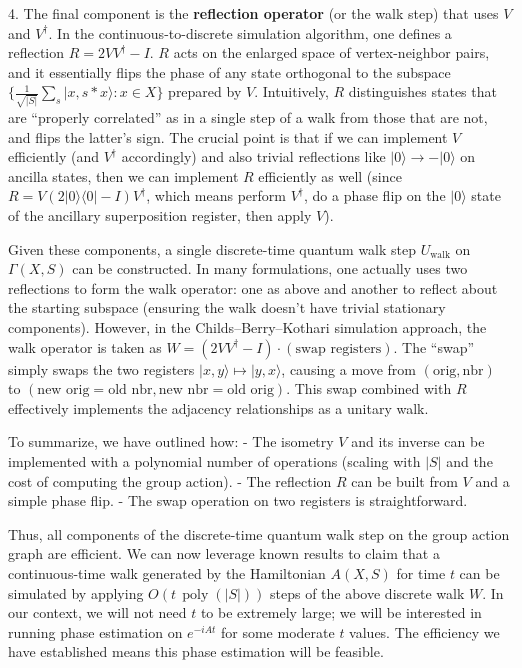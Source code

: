 \documentclass[11pt]{article}
\theoremstyle{definition}
\begin{document}
4. The final component is the \textbf{reflection operator} (or the walk step) that uses $V$ and $V^\dagger$. In the continuous-to-discrete simulation algorithm, one defines a reflection $R = 2V V^\dagger - I$. $R$ acts on the enlarged space of vertex-neighbor pairs, and it essentially flips the phase of any state orthogonal to the subspace $\{\frac{1}{\sqrt{|S|}}\sum_{s}|x,s*x\rangle: x \in X\}$ prepared by $V$. Intuitively, $R$ distinguishes states that are “properly correlated” as in a single step of a walk from those that are not, and flips the latter’s sign. The crucial point is that if we can implement $V$ efficiently (and $V^\dagger$ accordingly) and also trivial reflections like $|0\rangle \to -|0\rangle$ on ancilla states, then we can implement $R$ efficiently as well (since $R = V (2|0\rangle\!\langle 0| - I) V^\dagger$, which means perform $V^\dagger$, do a phase flip on the $|0\rangle$ state of the ancillary superposition register, then apply $V$).

Given these components, a single discrete-time quantum walk step $U_{\text{walk}}$ on $\Gamma(X,S)$ can be constructed. In many formulations, one actually uses two reflections to form the walk operator: one as above and another to reflect about the starting subspace (ensuring the walk doesn’t have trivial stationary components). However, in the Childs–Berry–Kothari simulation approach, the walk operator is taken as $W = (2V V^\dagger - I) \cdot ( \text{swap registers} )$. The “swap” simply swaps the two registers $|x,y\rangle \mapsto |y,x\rangle$, causing a move from $(\text{orig}, \text{nbr})$ to $(\text{new orig} = \text{old nbr}, \text{new nbr} = \text{old orig})$. This swap combined with $R$ effectively implements the adjacency relationships as a unitary walk.

To summarize, we have outlined how:
- The isometry $V$ and its inverse can be implemented with a polynomial number of operations (scaling with $|S|$ and the cost of computing the group action).
- The reflection $R$ can be built from $V$ and a simple phase flip.
- The swap operation on two registers is straightforward.

Thus, all components of the discrete-time quantum walk step on the group action graph are efficient. We can now leverage known results to claim that a continuous-time walk generated by the Hamiltonian $A(X,S)$ for time $t$ can be simulated by applying $O(t\,\operatorname{poly}(|S|))$ steps of the above discrete walk $W$. In our context, we will not need $t$ to be extremely large; we will be interested in running phase estimation on $e^{-iA t}$ for some moderate $t$ values. The efficiency we have established means this phase estimation will be feasible.
\end{document}
